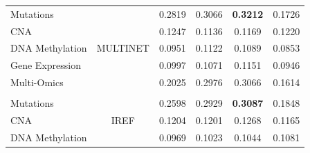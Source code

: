 \begin{table}[!th]
\begin{tabular}{lccccc}
Mutations                    &     \multirow{5}{*}{MULTINET}                          & 0.2819 & 0.3066                                                   & \textbf{0.3212}                                              & 0.1726                                                    \\
CNA                          &                              & 0.1247 & 0.1136                                                   & 0.1169                                                       & 0.1220                                                    \\
DNA Methylation              &                              & 0.0951 & 0.1122                                                   & 0.1089                                                       & 0.0853                                                    \\
Gene Expression              &                              & 0.0997 & 0.1071                                                   & 0.1151                                                       & 0.0946                                                    \\
Multi-Omics                  &                              & 0.2025 & 0.2976                                                   & 0.3066                                                       & 0.1614                                                    \\
                             &   &        &                                                          &                                                              &                                                           \\
Mutations                    &      \multirow{5}{*}{IREF}                          & 0.2598 & 0.2929                                                   & \textbf{0.3087}                                              & 0.1848                                                    \\
CNA                          &                              & 0.1204 & 0.1201                                                   & 0.1268                                                       & 0.1165                                                    \\
DNA Methylation              &                              & 0.0969 & 0.1023                                                   & 0.1044                                                       & 0.1081                                                    \\

\end{tabular}
\end{table}
